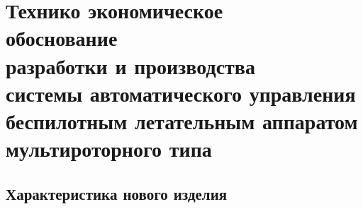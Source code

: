 
\section{Технико экономическое\\
  обоснование \\
  разработки и производства\\
  системы автоматического управления\\
  беспилотным летательным аппаратом\\
  мультироторного типа}






\subsection{Характеристика нового изделия}

